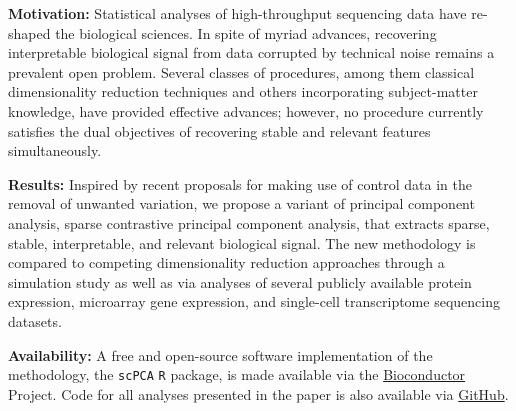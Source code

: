 \textbf{Motivation:} Statistical analyses of high-throughput sequencing data have re-shaped the biological sciences. In spite of myriad advances, recovering interpretable biological signal from data corrupted by technical noise remains a prevalent open problem. Several classes of procedures, among them classical dimensionality reduction techniques and others incorporating subject-matter knowledge, have provided effective advances; however, no procedure currently satisfies the dual objectives of recovering stable and relevant features simultaneously. 

\textbf{Results:} Inspired by recent proposals for making use of control data in the removal of unwanted variation, we propose a variant of principal component analysis, sparse contrastive principal component analysis, that extracts sparse, stable, interpretable, and relevant biological signal. The new methodology is compared to competing dimensionality reduction approaches through a simulation study as well as via analyses of several publicly available protein expression, microarray gene expression, and single-cell transcriptome sequencing datasets.

\textbf{Availability:} A free and open-source software implementation of the methodology, the \texttt{scPCA} \texttt{R} package, is made available via the \href{https://bioconductor.org/packages/release/bioc/html/scPCA.html}{Bioconductor} Project. Code for all analyses presented in the paper is also available via \href{https://github.com/PhilBoileau/EHDBDscPCA}{GitHub}.